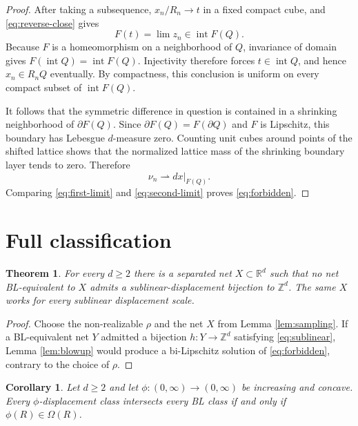 \documentclass[10pt]{article}
\newtheorem{theorem}{Theorem}
\newtheorem{corollary}{Corollary}
\newcommand{\R}{\mathbb R}
\newcommand{\Z}{\mathbb Z}
\begin{document}
\begin{proof}
After taking a subsequence, $x_n/R_n\to t$ in a fixed compact cube, and
\eqref{eq:reverse-close} gives
\[
 F(t)=\lim z_n\in\operatorname{int}F(Q).
\]
Because $F$ is a homeomorphism on a neighborhood of $Q$, invariance of domain
gives $F(\operatorname{int}Q)=\operatorname{int}F(Q)$.  Injectivity therefore
forces $t\in\operatorname{int}Q$, and hence $x_n\in R_nQ$ eventually.  By
compactness, this conclusion is uniform on every compact subset of
$\operatorname{int}F(Q)$.

It follows that the symmetric difference in question is contained in a
shrinking neighborhood of $\partial F(Q)$.  Since
$\partial F(Q)=F(\partial Q)$ and $F$ is Lipschitz, this boundary has
Lebesgue $d$-measure zero.  Counting unit cubes around points of the shifted
lattice shows that the normalized lattice mass of the shrinking boundary
layer tends to zero.  Therefore
\begin{equation}\label{eq:second-limit}
 \nu_n\rightharpoonup dx|_{F(Q)}.
\end{equation}
Comparing \eqref{eq:first-limit} and \eqref{eq:second-limit} proves
\eqref{eq:forbidden}.
\end{proof}

\section{Full classification}

\begin{theorem}\label{thm:main}
For every $d\ge2$ there is a separated net $X\subset\R^d$ such that no net
BL-equivalent to $X$ admits a sublinear-displacement bijection to $\Z^d$.
The same $X$ works for every sublinear displacement scale.
\end{theorem}

\begin{proof}
Choose the non-realizable $\rho$ and the net $X$ from Lemma
\ref{lem:sampling}.  If a BL-equivalent net $Y$ admitted a bijection
$h:Y\to\Z^d$ satisfying \eqref{eq:sublinear}, Lemma \ref{lem:blowup} would
produce a bi-Lipschitz solution of \eqref{eq:forbidden}, contrary to the
choice of $\rho$.
\end{proof}

\begin{corollary}\label{cor:classification}
Let $d\ge2$ and let $\phi:(0,\infty)\to(0,\infty)$ be increasing and
concave.  Every $\phi$-displacement class intersects every BL class if and
only if $\phi(R)\in\Omega(R)$.
\end{corollary}
\end{document}
